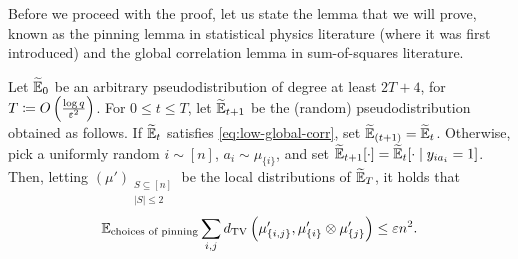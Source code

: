 \documentclass{article}
\begin{document}
Before we proceed with the proof, let us state the lemma that we will prove, known as the pinning lemma in statistical physics literature (where it was first introduced) and the global correlation lemma in sum-of-squares literature.

\begin{flem}
	Let $\widetilde{\mathbb{E}}_0$ be an arbitrary pseudodistribution of degree at least $2T + 4$, for $T \coloneqq O\left( \frac{\log q}{\varepsilon^2} \right)$. For $0 \le t \le T$, let $\widetilde{\mathbb{E}}_{t+1}$ be the (random) pseudodistribution obtained as follows. If $\widetilde{\mathbb{E}}_{t}$ satisfies \eqref{eq:low-global-corr}, set $\widetilde{\mathbb{E}}_{(t+1)} = \widetilde{\mathbb{E}}_t$. Otherwise, pick a uniformly random $i \sim [n]$, $a_i \sim \mu_{\{i\}}$, and set $\widetilde{\mathbb{E}}_{t+1}[\cdot] = \widetilde{\mathbb{E}}_t[\cdot \mid y_{ia_i} = 1]$. Then, letting $(\mu')_{\substack{S \subseteq [n] \\ |S| \le 2}}$ be the local distributions of $\widetilde{\mathbb{E}}_{T}$, it holds that
	\[ \mathbb{E}_{\text{choices of pinning}} \sum_{i,j} d_{\mathrm{TV}}\left( \mu'_{\{i,j\}} , \mu'_{\{i\}} \otimes \mu'_{\{j\}} \right)  \leq \varepsilon n^2. \]
\end{flem}




\end{document}
